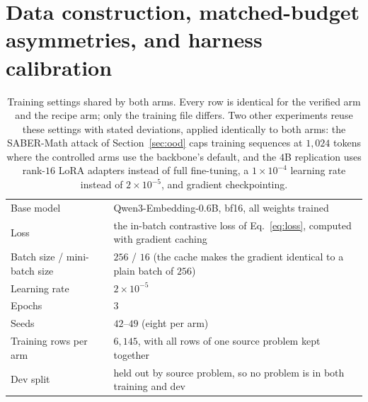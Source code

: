 \section{Data construction, matched-budget asymmetries, and harness calibration}
\label{app:setup}

\begin{table}[htbp]
\centering
\caption{Training settings shared by both arms. Every row is identical for the verified arm and the recipe arm; only the training file differs. Two other experiments reuse these settings with stated deviations, applied identically to both arms: the SABER-Math attack of Section~\ref{sec:ood} caps training sequences at $1{,}024$ tokens where the controlled arms use the backbone's default, and the $4$B replication uses rank-$16$ LoRA adapters instead of full fine-tuning, a $1 \times 10^{-4}$ learning rate instead of $2 \times 10^{-5}$, and gradient checkpointing.}
\label{tab:hparams}
\small
\begin{tabular}{l p{9.4cm}}
\toprule
Base model & Qwen3-Embedding-0.6B, bf16, all weights trained \\
Loss & the in-batch contrastive loss of Eq.~\ref{eq:loss}, computed with gradient caching~\citep{gao2021gradcache} \\
Batch size / mini-batch size & $256$ / $16$ (the cache makes the gradient identical to a plain batch of $256$) \\
Learning rate & $2 \times 10^{-5}$ \\
Epochs & $3$ \\
Seeds & $42$--$49$ (eight per arm) \\
Training rows per arm & $6{,}145$, with all rows of one source problem kept together \\
Dev split & held out by source problem, so no problem is in both training and dev \\
\bottomrule
\end{tabular}
\end{table}

